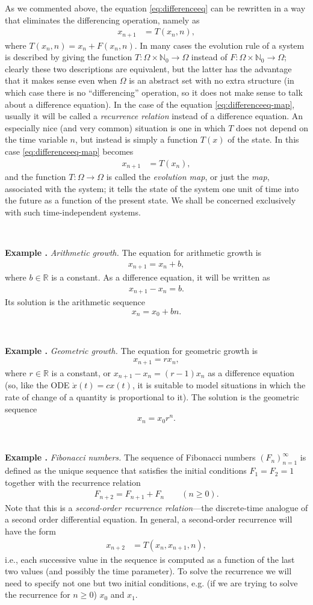 \documentclass[12pt]{amsart}
\newcommand{\eq}[1]{\begin{equation}\begin{split}#1\end{split}\end{equation}}
\newcommand{\eqst}[1]{\begin{align*}#1\end{align*}}
\newcounter{example}
\newcommand{\beginexample}[1]{\ \\ \addtocounter{example}{1} \textbf{Example \arabic{example}.} \textit{#1.}}
\begin{document}
As we commented above, the equation \eqref{eq:differenceeq} can be rewritten in a way that eliminates the differencing operation, namely as
\eq{ \label{eq:differenceeq-map}
x_{n+1} &= T(x_n,n),
}
where $T(x_n,n)=x_n+F(x_n,n)$. In many cases the evolution rule of a system is described by giving the function $T:\Omega\times \mathbb{N}_0\to\Omega$ instead of $F:\Omega\times \mathbb{N}_0\to\Omega$; clearly these two descriptions are equivalent, but the latter has the advantage that it makes sense even when $\Omega$ is an abstract set with no extra structure (in which case there is no ``differencing'' operation, so it does not make sense to talk about a difference equation). In the case of the equation \eqref{eq:differenceeq-map}, usually it will be called a \emph{recurrence relation} instead of a difference equation. An especially nice (and very common) situation is one in which $T$ does not depend on the time variable $n$, but instead is simply a function $T(x)$ of the state. In this case \eqref{eq:differenceeq-map} becomes
\eqst{
x_{n+1} &= T(x_n),
}
and the function $T:\Omega\to\Omega$ is called the \emph{evolution map}, or just the \emph{map}, associated with the system; it tells the state of the system one unit of time into the future as a function of the present state. We shall be concerned exclusively with such time-independent systems.

\beginexample{Arithmetic growth} The equation for arithmetic growth is
\eqst{ 
x_{n+1} = x_n + b,
}
where $b\in\mathbb{R}$ is a constant. As a difference equation, it will be written as
\eqst{ x_{n+1}-x_n = b. }
Its solution is the arithmetic sequence $$ x_n = x_0 + bn. $$

\beginexample{Geometric growth} The equation for geometric growth is
\eqst{
x_{n+1} = r x_n ,
}
where $r\in\mathbb{R}$ is a constant, or $x_{n+1}-x_n = (r-1)x_n$ as a difference equation (so, like the ODE $\dot{x}(t)=cx(t)$, it is suitable to model situations in which the rate of change of a quantity is proportional to it). The solution is the geometric sequence $$ x_n = x_0 r^n. $$


\beginexample{Fibonacci numbers} The sequence of Fibonacci numbers $(F_n)_{n=1}^\infty$ is defined as the unique sequence that satisfies the initial conditions $F_1=F_2=1$ together with the recurrence relation
\eq{ \label{eq:recurrence-fibonacci}
  F_{n+2}=F_{n+1}+F_n \qquad (n\ge0).
}
Note that this is a \emph{second-order recurrence relation}---the discrete-time analogue of a second order differential equation. In general, a second-order recurrence will have the form
\eqst{
x_{n+2} &= T(x_n,x_{n+1},n),
}
i.e., each successive value in the sequence is computed as a function of the last two values (and possibly the time parameter). To solve the recurrence we will need to specify not one but two initial conditions, e.g. (if we are trying to solve the recurrence for $n\ge0$) $x_0$ and $x_1$.
\end{document}
